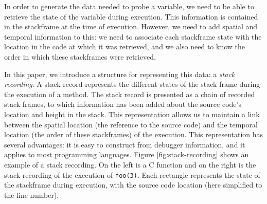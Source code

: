 \documentclass[english,submission]{programming}
\newcommand{\code}[1]{\colorbox{codegray}{\texttt{#1}}}
\begin{document}

In order to generate the data needed to probe a variable, we need to be able to retrieve the state of the variable during execution. 
This information is contained in the stackframe at the time of execution. 
However, we need to add spatial and temporal information to this: we need to associate each stackframe state with the location in the code at which it was retrieved, and we also need to know the order in which these stackframes were retrieved.

In this paper, we introduce a structure for representing this data: a \textit{stack recording}. 
A stack record represents the different states of the stack frame during the execution of a method. The stack record is presented as a chain of recorded stack frames, to which information has been added about the source code's location and height in the stack.
This representation allows us to maintain a link between the spatial location (the reference to the source code) and the temporal location (the order of these stackframes) of the execution.
This representation has several advantages: it is easy to construct from debugger information, and it applies to most programming languages.
Figure \ref{fig:stack-recording} shows an example of a stack recording. On the left is a C function and on the right is the stack recording of the execution of \code{foo(3)}. Each rectangle represents the state of the stackframe during execution, with the source code location (here simplified to the line number).
\end{document}
